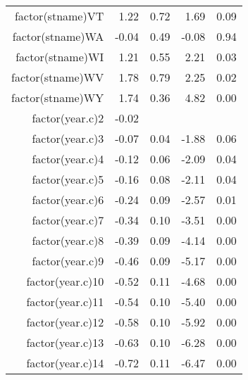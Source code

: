 \begin{table}[ht]
\begin{tabular}{rrrrr}
  factor(stname)VT & 1.22 & 0.72 & 1.69 & 0.09 \\ 
  factor(stname)WA & -0.04 & 0.49 & -0.08 & 0.94 \\ 
  factor(stname)WI & 1.21 & 0.55 & 2.21 & 0.03 \\ 
  factor(stname)WV & 1.78 & 0.79 & 2.25 & 0.02 \\ 
  factor(stname)WY & 1.74 & 0.36 & 4.82 & 0.00 \\ 
  factor(year.c)2 & -0.02 &  &  &  \\ 
  factor(year.c)3 & -0.07 & 0.04 & -1.88 & 0.06 \\ 
  factor(year.c)4 & -0.12 & 0.06 & -2.09 & 0.04 \\ 
  factor(year.c)5 & -0.16 & 0.08 & -2.11 & 0.04 \\ 
  factor(year.c)6 & -0.24 & 0.09 & -2.57 & 0.01 \\ 
  factor(year.c)7 & -0.34 & 0.10 & -3.51 & 0.00 \\ 
  factor(year.c)8 & -0.39 & 0.09 & -4.14 & 0.00 \\ 
  factor(year.c)9 & -0.46 & 0.09 & -5.17 & 0.00 \\ 
  factor(year.c)10 & -0.52 & 0.11 & -4.68 & 0.00 \\ 
  factor(year.c)11 & -0.54 & 0.10 & -5.40 & 0.00 \\ 
  factor(year.c)12 & -0.58 & 0.10 & -5.92 & 0.00 \\ 
  factor(year.c)13 & -0.63 & 0.10 & -6.28 & 0.00 \\ 
  factor(year.c)14 & -0.72 & 0.11 & -6.47 & 0.00 \\ 
   \hline
\end{tabular}
\end{table}
